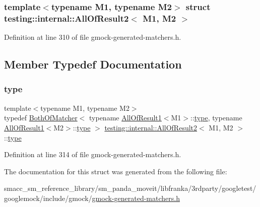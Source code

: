 \subsubsection*{template$<$typename M1, typename M2$>$\newline
struct testing\+::internal\+::\+All\+Of\+Result2$<$ M1, M2 $>$}



Definition at line 310 of file gmock-\/generated-\/matchers.\+h.



\subsection{Member Typedef Documentation}
\mbox{\label{structtesting_1_1internal_1_1AllOfResult2_adec0b0ce2fdd07d398e1fdd2cdb88392}} 
\subsubsection{\texorpdfstring{type}{type}}
{\footnotesize\ttfamily template$<$typename M1, typename M2$>$ \\
typedef \hyperlink{classtesting_1_1internal_1_1BothOfMatcher}{Both\+Of\+Matcher}$<$ typename \hyperlink{structtesting_1_1internal_1_1AllOfResult1}{All\+Of\+Result1}$<$M1$>$\+::\hyperlink{structtesting_1_1internal_1_1AllOfResult2_adec0b0ce2fdd07d398e1fdd2cdb88392}{type}, typename \hyperlink{structtesting_1_1internal_1_1AllOfResult1}{All\+Of\+Result1}$<$M2$>$\+::\hyperlink{structtesting_1_1internal_1_1AllOfResult2_adec0b0ce2fdd07d398e1fdd2cdb88392}{type} $>$ \hyperlink{structtesting_1_1internal_1_1AllOfResult2}{testing\+::internal\+::\+All\+Of\+Result2}$<$ M1, M2 $>$\+::\hyperlink{structtesting_1_1internal_1_1AllOfResult2_adec0b0ce2fdd07d398e1fdd2cdb88392}{type}}



Definition at line 314 of file gmock-\/generated-\/matchers.\+h.



The documentation for this struct was generated from the following file\+:\begin{DoxyCompactItemize}
\item 
smacc\+\_\+sm\+\_\+reference\+\_\+library/sm\+\_\+panda\+\_\+moveit/libfranka/3rdparty/googletest/googlemock/include/gmock/\hyperlink{gmock-generated-matchers_8h}{gmock-\/generated-\/matchers.\+h}\end{DoxyCompactItemize}
